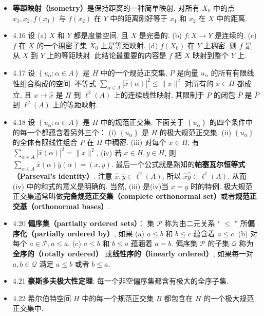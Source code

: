 \begin{itemize}
\item \textbf{等距映射（isometry）}是保持距离的一种简单映射. 对所有 $X_{0}$ 中的点 $x_{1}, x_{2}, f\left(x_{1}\right)$ 与 $f\left(x_{2}\right)$ 在 $Y$ 中的距离刚好等于 $x_{1}$ 和 $x_{2}$ 在 $X$ 中的距离.

\item 4.16 设 (a) $X$ 和 $Y$ 都是度量空间, 且 $X$ 是完备的. (b) $f: X \rightarrow Y$ 是连续的. (c) $f$ 在 $X$ 的一个稠密子集 $X_{0}$ 上是等距映射. (d) $f\left(X_{0}\right)$ 在 $Y$ 上稠密. 则 $f$ 是从 $X$ 到 $Y$ 上的等距映射. 此结论最重要的内容是 $f$ 把 $X$ 映射到整个 $Y$ 上.

\item 4.17 设 $\left\{u_{\alpha}: \alpha \in A\right\}$ 是 $H$ 中的一个规范正交集, $P$ 是向量 $u_{\alpha}$ 的所有有限线性组合构成的空间. 不等式 $\sum_{\alpha \in A}|\hat{x}(\alpha)|^{2} \leqslant\|x\|^{2}$ 对所有的 $x \in H$ 都成立, 且 $x \rightarrow \hat{x}$ 是 $H$ 到 $\ell^{2}(A)$ 上的连续线性映射, 其限制于 $P$ 的闭包 $\bar{P}$ 是 $\bar{P}$ 到 $\ell^{2}(A)$ 上的等距映射.

\item 4.18 设 $\left\{u_{\alpha}: \alpha \in A\right\}$ 是 $H$ 中的规范正交集. 下面关于 $\left\{u_{\alpha}\right\}$ 的四个条件中的每一个都蕴含着另外三个： (i) $\left\{u_{\alpha}\right\}$ 是 $H$ 的极大规范正交集. (ii) $\left\{u_{\alpha}\right\}$ 的全体有限线性组合 $P$ 在 $H$ 中稠密. (iii) 对每个 $x \in H$, 有 $\sum_{\alpha \in A}|\hat{x}(\alpha)|^{2}=\|x\|^{2}$. (iv) 若 $x \in H, y \in H$, 则 $\sum_{\alpha \in A} \hat{x}(\alpha) \overline{\hat{y}(\alpha)}=(x, y)$. 最后一个公式就是熟知的\textbf{帕塞瓦尔恒等式（Parseval's identity）}. 注意 $\hat{x},\hat{y} \in \ell^{2}(A)$, 所以 $\hat x\bar{\hat y} \in \ell^1(A)$. 从而 (iv) 中的和式的意义是明确的. 当然, (iii) 是(iv)当 $x=y$ 时的特例. 极大规范正交集通常叫做\textbf{完备规范正交集（complete orthonormal set）}或者\textbf{规范正交基（orthonormal bases）}.

\item 4.20 \textbf{偏序集（partially ordered sets）}： 集 $\mathscr{P}$ 称为由二元关系 " $\leqslant$ ” 所\textbf{偏序化（partially ordered by）}, 如果 (a) $a \leqslant b$ 和 $b \leqslant c$ 蕴含着 $a \leqslant c$. (b) 对每个 $a \in \mathscr{P}, a \leqslant a$. (c) $a \leqslant b$ 和 $b \leqslant a$ 蕴涵着 $a=b$. 偏序集 $\mathscr{P}$ 的子集 $\mathscr{Q}$ 称为\textbf{全序的（totally ordered）} 或\textbf{线性序的（linearly ordered）}, 如果每一对 $a, b \in \mathscr{Q}$ 满足 $a \leqslant b$ 或者 $b \leqslant a$.

\item 4.21 \textbf{豪斯多夫极大性定理}: 每一个非空偏序集都含有极大的全序子集.

\item 4.22 希尔伯特空间 $H$ 中的每一个规范正交集 $B$ 都包含在 $H$ 的一个极大规范正交集中.
\end{itemize}


